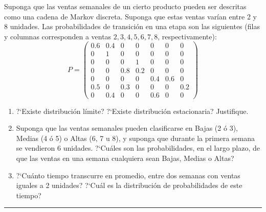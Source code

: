 \documentclass[10pt,a4paper]{article}
\newenvironment{enunciado}[1]{%
  \begin{tcolorbox}[
    breakable,
    colback=sectionbg!8, colframe=sectionbg,
    boxrule=0.8pt, arc=3pt, left=8pt, right=8pt, top=6pt, bottom=6pt,
    fonttitle=\normalsize\bfseries\sffamily, coltitle=white, colbacktitle=sectionbg, titlerule=0pt,
    title={#1},
  ]%
}{\end{tcolorbox}}
\begin{document}
\begin{enunciado}{P26 \textperiodcentered\ Ventas semanales como cadena de Markov}
  Suponga que las ventas semanales de un cierto producto pueden ser descritas como
  una cadena de Markov discreta. Suponga que estas ventas var\'ian entre 2 y 8
  unidades. Las probabilidades de transici\'on en una etapa son las siguientes
  (filas y columnas corresponden a ventas $2,3,4,5,6,7,8$, respectivamente):
  \[
    P = \begin{pmatrix}
      0.6 & 0.4 & 0   & 0   & 0   & 0   & 0   \\
      0   & 1   & 0   & 0   & 0   & 0   & 0   \\
      0   & 0   & 0   & 1   & 0   & 0   & 0   \\
      0   & 0   & 0.8 & 0.2 & 0   & 0   & 0   \\
      0   & 0   & 0   & 0   & 0.4 & 0.6 & 0   \\
      0.5 & 0   & 0.3 & 0   & 0   & 0   & 0.2 \\
      0   & 0.4 & 0   & 0   & 0.6 & 0   & 0
    \end{pmatrix}
  \]

  \begin{enumerate}[label=\alph*)]
    \item ?`Existe distribuci\'on l\'imite? ?`Existe distribuci\'on estacionaria?
          Justifique.
    \item Suponga que las ventas semanales pueden clasificarse en Bajas (2 \'o 3),
          Medias (4 \'o 5) o Altas (6, 7 u 8), y suponga que durante la primera semana
          se vendieron 6 unidades. ?`Cu\'ales son las probabilidades, en el largo plazo,
          de que las ventas en una semana cualquiera sean Bajas, Medias o Altas?
    \item ?`Cu\'anto tiempo transcurre en promedio, entre dos semanas con ventas iguales
          a 2 unidades? ?`Cu\'al es la distribuci\'on de probabilidades de este tiempo?
  \end{enumerate}
\end{enunciado}

\vspace{10pt}
{\color{subsecbg!60}\hrule}
\vspace{6pt}
\end{document}
